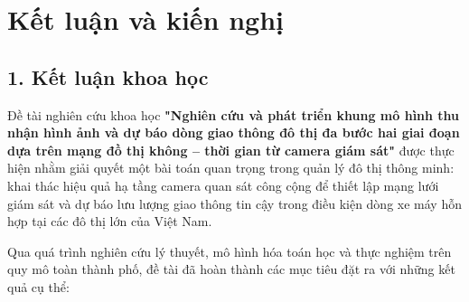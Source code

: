 \chapter*{Kết luận và kiến nghị}

\section*{1. Kết luận khoa học}
Đề tài nghiên cứu khoa học \textbf{"Nghiên cứu và phát triển khung mô hình thu nhận hình ảnh và dự báo dòng giao thông đô thị đa bước hai giai đoạn dựa trên mạng đồ thị không -- thời gian từ camera giám sát"} được thực hiện nhằm giải quyết một bài toán quan trọng trong quản lý đô thị thông minh: khai thác hiệu quả hạ tầng camera quan sát công cộng để thiết lập mạng lưới giám sát và dự báo lưu lượng giao thông tin cậy trong điều kiện dòng xe máy hỗn hợp tại các đô thị lớn của Việt Nam.

Qua quá trình nghiên cứu lý thuyết, mô hình hóa toán học và thực nghiệm trên quy mô toàn thành phố, đề tài đã hoàn thành các mục tiêu đặt ra với những kết quả cụ thể:

